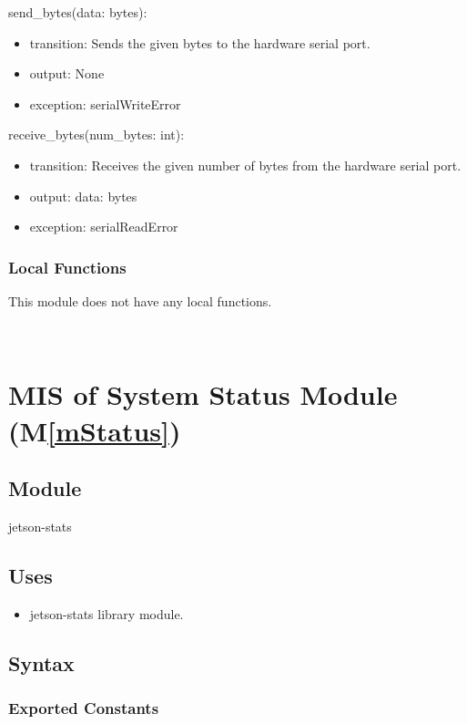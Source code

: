 \documentclass[12pt, titlepage]{article}
\newcommand{\mref}[1]{M\ref{#1}}
\begin{document}
\noindent send\_bytes(data: bytes):
\begin{itemize}
  \item transition: Sends the given bytes to the hardware serial port.
  \item output: None
  \item exception: serialWriteError
\end{itemize}

\noindent receive\_bytes(num\_bytes: int):
\begin{itemize}
  \item transition: Receives the given number of bytes from the hardware serial port.
  \item output: data: bytes
  \item exception: serialReadError
\end{itemize}

\subsubsection{Local Functions}

This module does not have any local functions.

\ \

\section{MIS of System Status Module (\mref{mStatus})}

\subsection{Module}

jetson-stats

\subsection{Uses}

\begin{itemize}
  \item jetson-stats library module.
\end{itemize}

\subsection{Syntax}

\subsubsection{Exported Constants}
\end{document}
